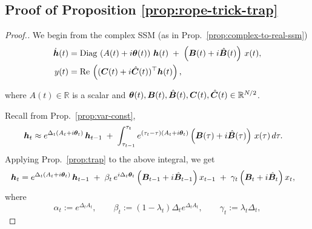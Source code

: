 \subsection{Proof of Proposition \ref{prop:rope-trick-trap}}
\label{app:proof-rope-trick-trap}
\PropRoPETrickTrap*
\begin{proof}[Proof.]
We begin from the complex SSM (as in Prop.~\ref{prop:complex-to-real-ssm})
\begin{align*}
    \dot{{\bm{h}}}(t)
    &= \mathrm{Diag}\,\left(A(t)+i\boldsymbol{\theta}(t)\right)\,{\bm{h}}(t)
      \;+\;\left({\bm{B}}(t)+i\hat{{\bm{B}}}(t)\right)\,x(t),\\
    y(t)
    &= \mathrm{Re}\,\left(({\bm{C}}(t)+i\hat{{\bm{C}}}(t))^\top {\bm{h}}(t)\right),
\end{align*}

where $A(t)\in\mathbb{R}$ is a scalar and $\boldsymbol{\theta}(t),{\bm{B}}(t),\hat{{\bm{B}}}(t),{\bm{C}}(t),\hat{{\bm{C}}}(t)\in\mathbb{R}^{N/2}$.

\medskip
Recall from Prop.~\ref{prop:var-const},
\begin{align*}
{\bm{h}}_t
&\approx e^{\Delta_t(A_t+i\boldsymbol{\theta}_t)}\,{\bm{h}}_{t-1}
\;+\; \int_{\tau_{t-1}}^{\tau_t}
      e^{(\tau_t-\tau)(A_t+i\boldsymbol{\theta}_t)}
      \left({\bm{B}}(\tau)+i\hat{{\bm{B}}}(\tau)\right)\,x(\tau)\,d\tau.
\end{align*}
Applying Prop.~\ref{prop:trap} to the above integral, we get 
\begin{align}
\label{eq:trap-complex}
{\bm{h}}_t
&= e^{\Delta_t(A_t+i\boldsymbol{\theta}_t)}\,{\bm{h}}_{t-1}
  \;+\; \beta_t\,e^{i\Delta_t\boldsymbol{\theta}_t}\left({\bm{B}}_{t-1}+i\hat{{\bm{B}}}_{t-1}\right)x_{t-1}
  \;+\; \gamma_t\left({\bm{B}}_t+i\hat{{\bm{B}}}_t\right)x_t,
\end{align}
where
\[
\alpha_t:=e^{\Delta_t A_t},\qquad
\beta_t:=(1-\lambda_t)\Delta_t e^{\Delta_t A_t},\qquad
\gamma_t:=\lambda_t\Delta_t,
\]


\end{proof}
